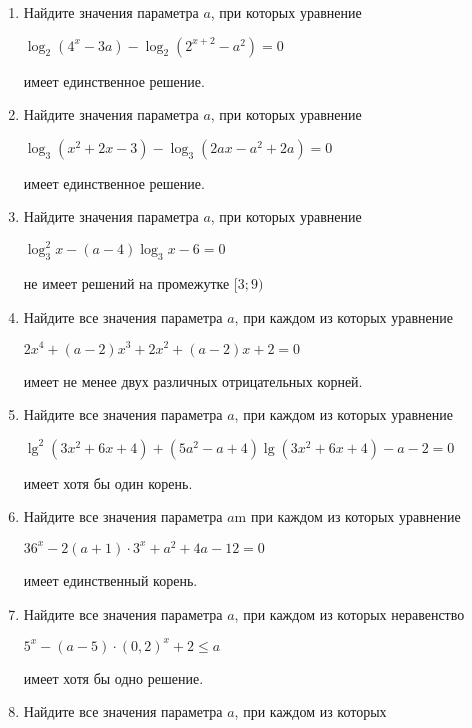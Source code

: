 \documentclass[12pt]{article}
\begin{document}
 \begin{enumerate}[start=1,label={\itshape\bfseries \arabic*.}]
    \item Найдите значения параметра $a$, при которых уравнение
    \begin{center}
        $\log_2{(4^x - 3a)} - \log_2{(2^{x + 2} - a^2)} = 0$
    \end{center}
    имеет единственное решение.
    \item Найдите значения параметра $a$, при которых уравнение
    \begin{center}
        $\log_3{(x^2 + 2x - 3)} - \log_3{(2ax - a^2 + 2a)} = 0$
    \end{center}
    имеет единственное решение.
    \item Найдите значения параметра $a$, при которых уравнение
    \begin{center}
        $\log^2_3{x} - (a - 4)\log_3{x} - 6 = 0$
    \end{center}
    не имеет решений на промежутке $[3; 9)$
    \item Найдите все значения параметра $a$, при каждом из которых уравнение \begin{center} $2x^4 + (a - 2)x^3 + 2x^2 + (a - 2)x + 2 = 0$\end{center}
    имеет не менее двух различных отрицательных корней.
    \item Найдите все значения параметра $a$, при каждом из которых уравнение \begin{center} $\lg^2{(3x^2 + 6x + 4)} + (5a^2 - a + 4)\lg{(3x^2 + 6x + 4)} -a - 2 = 0$\end{center} имеет хотя бы один корень.
    \item Найдите все значения параметра $a$m при каждом из которых уравнение \begin{center}$36^x - 2(a + 1) \cdot 3^x + a^2 + 4a - 12 = 0$ \end{center} имеет единственный корень.
    \item Найдите все значения параметра $a$, при каждом из которых неравенство \begin{center}
        $5^x - (a - 5) \cdot (0,2)^x + 2 \le a$
    \end{center}
    имеет хотя бы одно решение.
    \item Найдите все значения параметра $a$, при каждом из которых
\end{enumerate}



\end{document}
